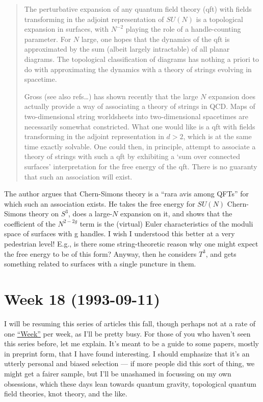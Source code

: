 \documentclass{article}
\begin{document}
\begin{quote}
The perturbative expansion of any quantum field theory (qft) with fields
transforming in the adjoint representation of \(SU(N)\) is a topological
expansion in surfaces, with \(N^{-2}\) playing the role of a
handle-counting parameter. For \(N\) large, one hopes that the dynamics
of the qft is approximated by the sum (albeit largely intractable) of
all planar diagrams. The topological classification of diagrams has
nothing a priori to do with approximating the dynamics with a theory of
strings evolving in spacetime.

Gross (see also refs\ldots) has shown recently that the large \(N\)
expansion does actually provide a way of associating a theory of strings
in QCD. Maps of two-dimensional string worldsheets into two-dimensional
spacetimes are necessarily somewhat constricted. What one would like is
a qft with fields transforming in the adjoint representation in
\(d > 2\), which is at the same time exactly solvable. One could then,
in principle, attempt to associate a theory of strings with such a qft
by exhibiting a `sum over connected surfaces' interpretation for the
free energy of the qft. There is no guaranty that such an association
will exist.
\end{quote}

The author argues that Chern-Simons theory is a ``rara avis among QFTs''
for which such an association exists. He takes the free energy for
\(SU(N)\) Chern-Simons theory on \(S^3\), does a large-\(N\) expansion
on it, and shows that the coefficient of the \(N^{2-2g}\) term is the
(virtual) Euler characteristics of the moduli space of surfaces with g
handles. I wish I understood this better at a very pedestrian level!
E.g., is there some string-theoretic reason why one might expect the
free energy to be of this form? Anyway, then he considers \(T^3\), and
gets something related to surfaces with a single puncture in them.
\hypertarget{week18}{%
\section{Week 18 (1993-09-11)}\label{week18}}

I will be resuming this series of articles this fall, though perhaps not
at a rate of one \protect\hyperlink{week}{``Week''} per week, as I'll be
pretty busy. For those of you who haven't seen this series before, let
me explain. It's meant to be a guide to some papers, mostly in preprint
form, that I have found interesting. I should emphasize that it's an
utterly personal and biased selection --- if more people did this sort
of thing, we might get a fairer sample, but I'll be unashamed in
focussing on my own obsessions, which these days lean towards quantum
gravity, topological quantum field theories, knot theory, and the like.
\end{document}
